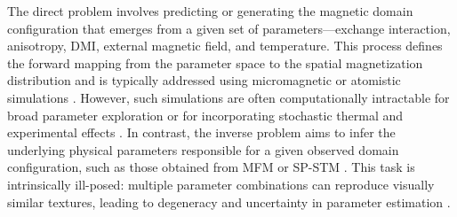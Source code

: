 \documentclass[letterpaper, 12, one column]{article}
\begin{document}
The direct problem involves predicting or generating the magnetic domain configuration that emerges from a given set of parameters—exchange interaction, anisotropy, DMI, external magnetic field, and temperature. This process defines the forward mapping from the parameter space to the spatial magnetization distribution and is typically addressed using micromagnetic or atomistic simulations \cite{Li2023Magnetic}. However, such simulations are often computationally intractable for broad parameter exploration or for incorporating stochastic thermal and experimental effects \cite{Trabzon2025Micromagnetic}. In contrast, the inverse problem aims to infer the underlying physical parameters responsible for a given observed domain configuration, such as those obtained from MFM or SP-STM \cite{Sass2020MagneticImaging}. This task is intrinsically ill-posed: multiple parameter combinations can reproduce visually similar textures, leading to degeneracy and uncertainty in parameter estimation \cite{Feng2024}.
\end{document}
